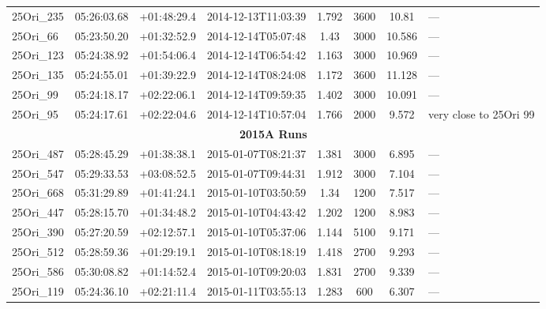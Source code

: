 \documentclass[12pt]{article}
\begin{document}
\begin{table}
\begin{center}
\begin{threeparttable}
\begin{tabular}{lccccccl}
	25Ori\_235    & 05:26:03.68 & +01:48:29.4 & 2014-12-13T11:03:39  & 1.792         & 3600             & 10.81  & ---                      \\
	25Ori\_66     & 05:23:50.20 & +01:32:52.9 & 2014-12-14T05:07:48  & 1.43          & 3000             & 10.586 & ---                      \\
	25Ori\_123    & 05:24:38.92 & +01:54:06.4 & 2014-12-14T06:54:42  & 1.163         & 3000             & 10.969 & ---                      \\
	25Ori\_135    & 05:24:55.01 & +01:39:22.9 & 2014-12-14T08:24:08  & 1.172         & 3600             & 11.128 & ---                      \\
	25Ori\_99     & 05:24:18.17 & +02:22:06.1 & 2014-12-14T09:59:35  & 1.402         & 3000             & 10.091 & ---                      \\
	25Ori\_95     & 05:24:17.61 & +02:22:04.6 & 2014-12-14T10:57:04  & 1.766         & 2000             & 9.572  & very close to 25Ori 99   \\
	\multicolumn{8}{c}{{\bf 2015A Runs}} \\
	25Ori\_487    & 05:28:45.29 & +01:38:38.1 & 2015-01-07T08:21:37  & 1.381         & 3000             & 6.895  & ---                      \\
	25Ori\_547    & 05:29:33.53 & +03:08:52.5 & 2015-01-07T09:44:31  & 1.912         & 3000             & 7.104  & ---                      \\
	25Ori\_668    & 05:31:29.89 & +01:41:24.1 & 2015-01-10T03:50:59  & 1.34          & 1200             & 7.517  & ---                      \\
	25Ori\_447    & 05:28:15.70 & +01:34:48.2 & 2015-01-10T04:43:42  & 1.202         & 1200             & 8.983  & ---                      \\
	25Ori\_390    & 05:27:20.59 & +02:12:57.1 & 2015-01-10T05:37:06  & 1.144         & 5100             & 9.171  & ---                      \\
	25Ori\_512    & 05:28:59.36 & +01:29:19.1 & 2015-01-10T08:18:19  & 1.418         & 2700             & 9.293  & ---                      \\
	25Ori\_586    & 05:30:08.82 & +01:14:52.4 & 2015-01-10T09:20:03  & 1.831         & 2700             & 9.339  & ---                      \\
	25Ori\_119    & 05:24:36.10 & +02:21:11.4 & 2015-01-11T03:55:13  & 1.283         & 600              & 6.307  & ---                      \\

\end{tabular}
\end{threeparttable}
\end{center}
\end{table}
\end{document}
